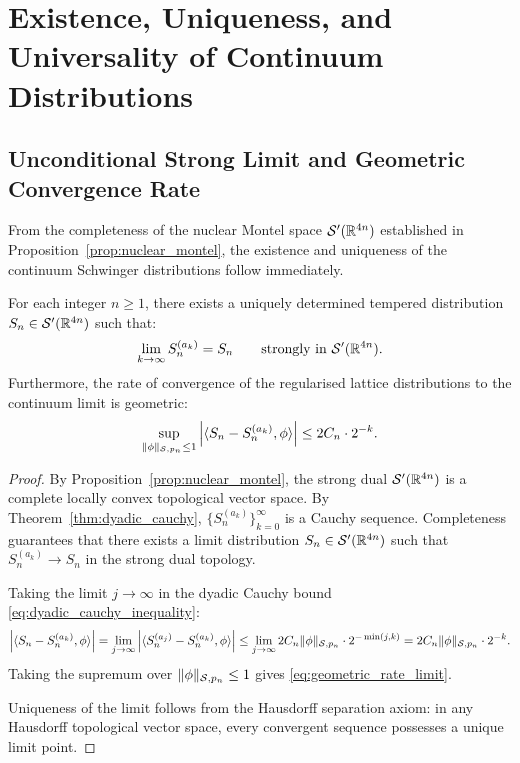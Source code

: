 \section{Existence, Uniqueness, and Universality of Continuum Distributions}
\label{sec:uniqueness_continuum}

\subsection{Unconditional Strong Limit and Geometric Convergence Rate}
\label{subsec:strong_limit_corollary}

From the completeness of the nuclear Montel space $\mathcal{S}'(\mathbb{R}^{4n})$ established in Proposition~\ref{prop:nuclear_montel}, the existence and uniqueness of the continuum Schwinger distributions follow immediately.

\begin{corollary}
\label{cor:strong_limit}
For each integer $n \ge 1$, there exists a uniquely determined tempered distribution $S_n \in \mathcal{S}'(\mathbb{R}^{4n})$ such that:
\begin{equation}
\label{eq:strong_limit_def}
\lim_{k \to \infty} S_n^{(a_k)} = S_n \qquad \text{strongly in } \mathcal{S}'(\mathbb{R}^{4n}).
\end{equation}
Furthermore, the rate of convergence of the regularised lattice distributions to the continuum limit is geometric:
\begin{equation}
\label{eq:geometric_rate_limit}
\sup_{\|\phi\|_{\mathcal{S}, p_n} \le 1} \left| \langle S_n - S_n^{(a_k)}, \phi \rangle \right| \le 2 C_n \cdot 2^{-k}.
\end{equation}
\end{corollary}

\begin{proof}
By Proposition~\ref{prop:nuclear_montel}, the strong dual $\mathcal{S}'(\mathbb{R}^{4n})$ is a complete locally convex topological vector space. By Theorem~\ref{thm:dyadic_cauchy}, $\{S_n^{(a_k)}\}_{k=0}^\infty$ is a Cauchy sequence. Completeness guarantees that there exists a limit distribution $S_n \in \mathcal{S}'(\mathbb{R}^{4n})$ such that $S_n^{(a_k)} \to S_n$ in the strong dual topology.

Taking the limit $j \to \infty$ in the dyadic Cauchy bound \eqref{eq:dyadic_cauchy_inequality}:
\begin{equation}
\left| \langle S_n - S_n^{(a_k)}, \phi \rangle \right| = \lim_{j \to \infty} \left| \langle S_n^{(a_j)} - S_n^{(a_k)}, \phi \rangle \right| \le \lim_{j \to \infty} 2 C_n \|\phi\|_{\mathcal{S}, p_n} \cdot 2^{-\min(j, k)} = 2 C_n \|\phi\|_{\mathcal{S}, p_n} \cdot 2^{-k}.
\end{equation}
Taking the supremum over $\|\phi\|_{\mathcal{S}, p_n} \le 1$ gives \eqref{eq:geometric_rate_limit}.

Uniqueness of the limit follows from the Hausdorff separation axiom: in any Hausdorff topological vector space, every convergent sequence possesses a unique limit point.
\end{proof}

